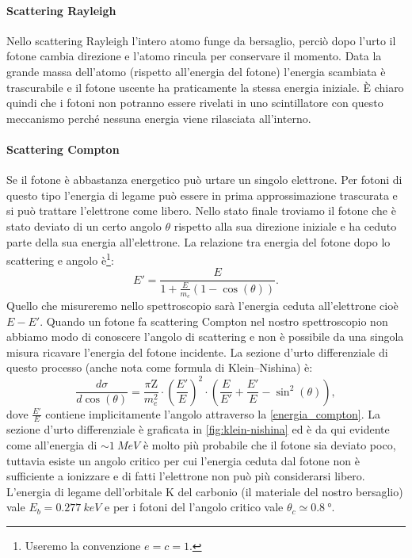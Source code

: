  \paragraph{Scattering Rayleigh}
 Nello scattering Rayleigh l'intero atomo funge da bersaglio, perciò dopo l'urto il fotone cambia direzione e l'atomo rincula per conservare il momento. Data la grande massa dell'atomo (rispetto all'energia del fotone) l'energia scambiata è trascurabile e il fotone uscente ha praticamente la stessa energia iniziale. \`E chiaro quindi che i fotoni non potranno essere rivelati in uno scintillatore con questo meccanismo perché nessuna energia viene rilasciata all'interno.
 
 \paragraph{Scattering Compton}
 Se il fotone è abbastanza energetico può urtare un singolo elettrone. Per fotoni di questo tipo l'energia di legame può essere in prima approssimazione trascurata e si può trattare l'elettrone come libero. Nello stato finale troviamo il fotone che è stato deviato di un certo angolo $\theta$ rispetto alla sua direzione iniziale e ha ceduto parte della sua energia all'elettrone. La relazione tra energia del fotone dopo lo scattering e angolo è\footnote{Useremo la convenzione $e = c = 1$.}:
 \begin{equation}
 \label{energia_compton} 
 E' = \frac{E}{1+\frac{E}{m_e}(1-\cos(\theta))}.
 \end{equation}
 Quello che misureremo nello spettroscopio sarà l'energia ceduta all'elettrone cioè $E-E'$. Quando un fotone fa scattering Compton nel nostro spettroscopio non abbiamo modo di conoscere l'angolo di scattering e non è possibile da una singola misura ricavare l'energia del fotone incidente.
 La sezione d'urto differenziale di questo processo (anche nota come formula di Klein–Nishina) è:
 \begin{equation}
 \label{klein-nishina}
 \frac{d\sigma}{d\cos(\theta)} = \frac{\pi\text{Z}}{m_e^2} \cdot\left(\frac{E'}{E}\right)^2 \cdot \left(\frac{E}{E'} + \frac{E'}{E} - \sin^2(\theta)\right),
 \end{equation}
 dove $\frac{E'}{E}$ contiene implicitamente l'angolo attraverso la \eqref{energia_compton}.
 La sezione d'urto differenziale è graficata in \autoref{fig:klein-nishina}
 ed è da qui evidente come all'energia di $\sim \SI{1}{MeV}$ è molto più probabile che il fotone sia deviato poco, tuttavia esiste un angolo critico per cui l'energia ceduta dal fotone non è sufficiente a ionizzare e di fatti l'elettrone non può più considerarsi libero. L'energia di legame dell'orbitale K del carbonio (il materiale del nostro bersaglio) vale $E_b = \SI{0.277}{keV}$ e per i fotoni del \co\; l'angolo critico vale $\theta_c \simeq \SI{0.8}{\degree}$. 
 
